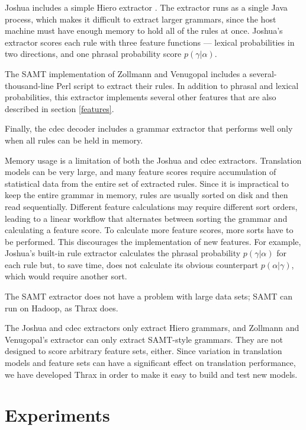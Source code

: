 \documentclass[11pt]{article}
\begin{document}
Joshua includes a simple Hiero extractor \cite{schwartz2010}. The
extractor runs as a single Java process, which makes it difficult to
extract larger grammars, since the host machine must have enough
memory to hold all of the rules at once.  Joshua's extractor scores each rule with three feature functions --- lexical probabilities in two directions, and one phrasal probability score $p(\gamma|\alpha)$.

The SAMT implementation of Zollmann and Venugopal 
includes a several-thousand-line Perl script to extract their rules.  In addition to phrasal and lexical probabilities, this extractor implements several other features that are also described in section \ref{features}.

Finally, the cdec decoder \cite {cdec} includes a grammar extractor that performs well only when all rules can be held in memory.

Memory usage is a limitation of both the Joshua and cdec
extractors. Translation models can be very large, and many feature
scores require accumulation of statistical data from the entire set of
extracted rules. Since it is impractical to keep the entire grammar in
memory, rules are usually sorted on disk and then read sequentially.
Different feature calculations may require different sort orders,
leading to a linear workflow that alternates between sorting the
grammar and calculating a feature score. To calculate more feature
scores, more sorts have to be performed. This discourages the
implementation of new features. For example, Joshua's built-in rule
extractor calculates the phrasal probability $p(\gamma|\alpha)$ for
each rule but, to save time, does not calculate its obvious
counterpart $p(\alpha|\gamma)$, which would require another sort.

The SAMT extractor does not have a problem with large data sets; SAMT
can run on Hadoop, as Thrax does. 

The Joshua and cdec extractors only extract Hiero grammars, and Zollmann and Venugopal's extractor can only extract SAMT-style grammars. They are not designed to score arbitrary feature sets, either. Since variation in translation models and feature sets can have a significant effect on translation performance, we have developed Thrax in order to make it easy to build and test new models. 

\section{Experiments}
\label{section:results}
\end{document}
